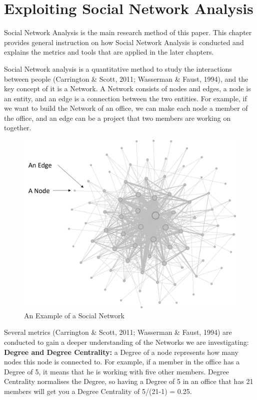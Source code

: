 \documentclass[12pt,a4paper,oneside]{book}
\begin{document}
\begin{sloppypar}
\chapter{Exploiting Social Network Analysis}
\label{SNA}
Social Network Analysis is the main research method of this paper. This chapter provides general instruction on how Social Network Analysis is conducted and explains the metrics and tools that are applied in the later chapters.

Social Network analysis is a quantitative method to study the interactions between people (Carrington \& Scott, 2011; Wasserman \& Faust, 1994), and the key concept of it is a Network. A Network consists of nodes and edges, a node is an entity, and an edge is a connection between the two entities. For example, if we want to build the Network of an office, we can make each node a member of the office, and an edge can be a project that two members are working on together.

\begin{figure}[H]
\centering
\includegraphics[scale=0.7]{graph/network explain.png}
\caption{An Example of a Social Network}
\label{fig:networkExplain}
\end{figure}

\pagebreak
Several metrics (Carrington \& Scott, 2011; Wasserman \& Faust, 1994) are conducted to gain a deeper understanding of the Networks we are investigating:
\\

\textbf{Degree and Degree Centrality:} a Degree of a node represents how many nodes this node is connected to. For example, if a member in the office has a Degree of 5, it means that he is working with five other members. Degree Centrality normalises the Degree, so having a Degree of 5 in an office that has 21 members will get you a Degree Centrality of 5/(21-1) = 0.25.


\end{sloppypar}
\end{document}
